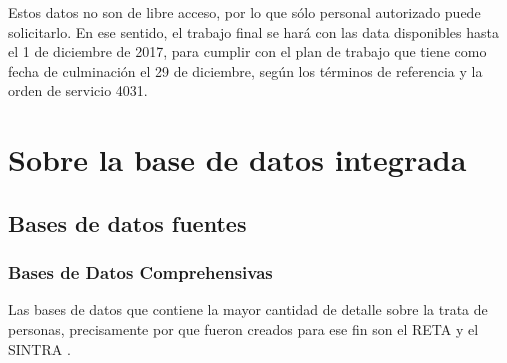 \documentclass{article}
\begin{document}
Estos datos no son de libre acceso, por lo que sólo personal autorizado puede solicitarlo. En ese sentido, el trabajo final se hará con las data disponibles hasta el 1 de diciembre de 2017, para cumplir con el plan de trabajo que tiene como  fecha de culminación el 29 de diciembre, según los términos de referencia y la orden de servicio 4031.

\section{Sobre la base de datos integrada}

\subsection{Bases de datos fuentes}
\subsubsection{Bases de Datos Comprehensivas}

Las bases de datos que contiene la mayor cantidad de detalle sobre la trata de personas, precisamente por que fueron creados para ese fin son el RETA y el SINTRA \cite{observatorio_nacional_de_politica_criminal_indaga_como_2017}.
\end{document}
